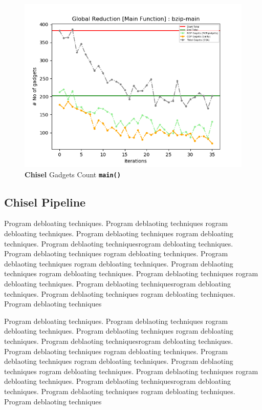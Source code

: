 \documentclass{relatorio}
\begin{document}
\begin{figure}[H]
	\includegraphics[width=1\linewidth]{imgs/plots/chisel_gadgets_bzip-main_plot.png}
	\caption{\textbf{Chisel} Gadgets Count \textbf{\texttt{main()}}}%
	\label{fig:plant}
\end{figure}

\subsection{Chisel Pipeline}%
\label{Tools}

Program debloating techniques. Program deblaoting techniques rogram debloating techniques. Program deblaoting techniques
rogram debloating techniques. Program deblaoting techniquesrogram debloating techniques. Program deblaoting techniques
rogram debloating techniques. Program deblaoting techniques rogram debloating techniques. Program deblaoting techniques
rogram debloating techniques. Program deblaoting techniques 
rogram debloating techniques. Program deblaoting techniquesrogram debloating techniques. Program deblaoting techniques
rogram debloating techniques. Program deblaoting techniques

Program debloating techniques. Program deblaoting techniques rogram debloating techniques. Program deblaoting techniques
rogram debloating techniques. Program deblaoting techniquesrogram debloating techniques. Program deblaoting techniques
rogram debloating techniques. Program deblaoting techniques rogram debloating techniques. Program deblaoting techniques
rogram debloating techniques. Program deblaoting techniques 
rogram debloating techniques. Program deblaoting techniquesrogram debloating techniques. Program deblaoting techniques
rogram debloating techniques. Program deblaoting techniques
\end{document}

